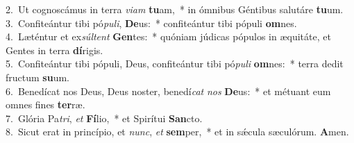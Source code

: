 {2.~}Ut cognoscámus in terra \textit{vi}\textit{am} \textbf{tu}am,~* in ómnibus Géntibus salutáre \textbf{tu}um.\\
{3.~}Confiteántur tibi pó\textit{pu}\textit{li}, \textbf{De}us:~* confiteántur tibi pópuli \textbf{om}nes.\\
{4.~}Læténtur et ex\textit{súl}\textit{tent} \textbf{Gen}tes:~* quóniam júdicas pópulos in æquitáte, et Gentes in terra \textbf{dí}rigis.\\
{5.~}Confiteántur tibi pópuli, Deus, confiteántur tibi pó\textit{pu}\textit{li} \textbf{om}nes:~* terra dedit fructum \textbf{su}um.\\
{6.~}Benedícat nos Deus, Deus noster, benedí\textit{cat} \textit{nos} \textbf{De}us:~* et métuant eum omnes fines \textbf{ter}ræ.\\
{7.~}Glória Pa\textit{tri}, \textit{et} \textbf{Fí}lio,~* et Spirítui \textbf{San}cto.\\
{8.~}Sicut erat in princípio, et \textit{nunc}, \textit{et} \textbf{sem}per,~* et in sǽcula sæculórum. \textbf{A}men.\\
